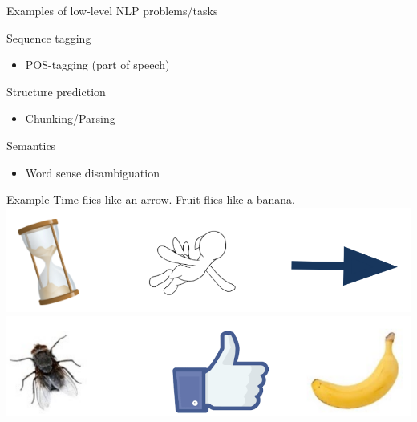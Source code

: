 \documentclass[12pt]{beamer}
\begin{document}
\begin{frame}{Examples of low-level NLP problems/tasks}
	
Sequence tagging

\begin{itemize}
	\item POS-tagging (part of speech)
\end{itemize}

Structure prediction
\begin{itemize}
	\item Chunking/Parsing
\end{itemize}


Semantics
\begin{itemize}
	\item Word sense disambiguation
\end{itemize}

	
	\begin{exampleblock}{Example}
		Time flies   like   an   arrow. \hfil Fruit   flies   like   a   banana. \\
		\includegraphics[width=0.3\linewidth]{img/screenshot_2021-03-24_16-49-31.png} \hspace{5.5em}
		\includegraphics[width=0.3\linewidth]{img/screenshot_2021-03-24_16-49-45.png}
	\end{exampleblock}
	
\end{frame}
\end{document}
